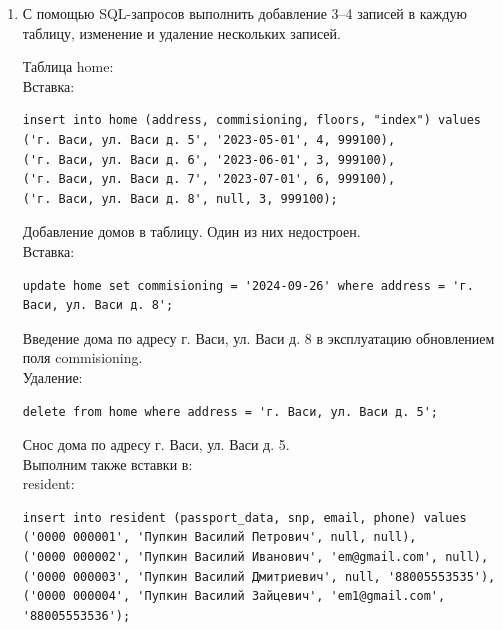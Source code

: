 \documentclass[a4paper,14pt]{extarticle}
\begin{document}
\begin{enumerate}[1.]
\item С помощью SQL-запросов выполнить добавление 3–4 записей в каждую таблицу,
изменение и удаление нескольких записей.

Таблица home:\\
Вставка:
\begin{verbatim}
insert into home (address, commisioning, floors, "index") values 
('г. Васи, ул. Васи д. 5', '2023-05-01', 4, 999100),
('г. Васи, ул. Васи д. 6', '2023-06-01', 3, 999100),
('г. Васи, ул. Васи д. 7', '2023-07-01', 6, 999100),
('г. Васи, ул. Васи д. 8', null, 3, 999100);
\end{verbatim}
Добавление домов в таблицу. Один из них недостроен.\\

Вставка:
\begin{verbatim}
update home set commisioning = '2024-09-26' where address = 'г. Васи, ул. Васи д. 8';
\end{verbatim}
Введение дома по адресу г. Васи, ул. Васи д. 8 в эксплуатацию обновлением поля commisioning.\\

Удаление:
\begin{verbatim}
delete from home where address = 'г. Васи, ул. Васи д. 5';
\end{verbatim}
Снос дома по адресу г. Васи, ул. Васи д. 5.\\

Выполним также вставки в:\\
resident:
\begin{verbatim}
insert into resident (passport_data, snp, email, phone) values
('0000 000001', 'Пупкин Василий Петрович', null, null), 
('0000 000002', 'Пупкин Василий Иванович', 'em@gmail.com', null), 
('0000 000003', 'Пупкин Василий Дмитриевич', null, '88005553535'), 
('0000 000004', 'Пупкин Василий Зайцевич', 'em1@gmail.com', '88005553536');
\end{verbatim}


\end{enumerate}
\end{document}
